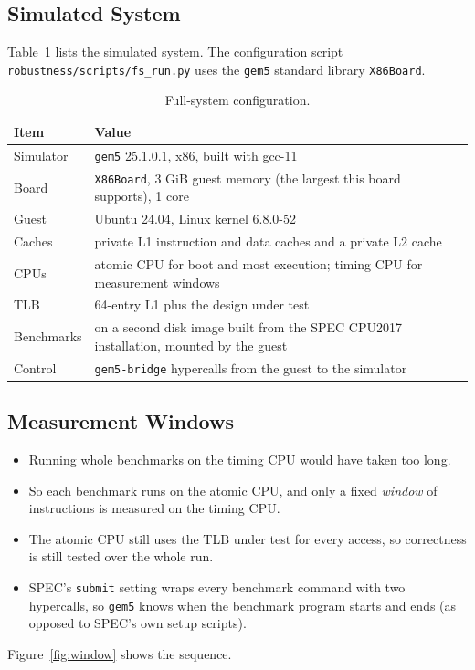 \subsection{Simulated System}
Table~\ref{tab:fs_setup} lists the simulated system. The configuration script \texttt{robustness/scripts/fs\_run.py} uses the \texttt{gem5} standard library \texttt{X86Board}.

\begin{table}[H]
\centering
\small
\caption{Full-system configuration.}
\label{tab:fs_setup}
\begin{tabularx}{\textwidth}{l X}
\toprule
\textbf{Item} & \textbf{Value} \\
\midrule
Simulator & \texttt{gem5} 25.1.0.1, x86, built with gcc-11 \\
Board & \texttt{X86Board}, 3 GiB guest memory (the largest this board supports), 1 core \\
Guest & Ubuntu 24.04, Linux kernel 6.8.0-52 \\
Caches & private L1 instruction and data caches and a private L2 cache \\
CPUs & atomic CPU for boot and most execution; timing CPU for measurement windows \\
TLB & 64-entry L1 plus the design under test \\
Benchmarks & on a second disk image built from the SPEC CPU2017 installation, mounted by the guest \\
Control & \texttt{gem5-bridge} hypercalls from the guest to the simulator \\
\bottomrule
\end{tabularx}
\end{table}

\subsection{Measurement Windows}
\begin{itemize}
    \item Running whole benchmarks on the timing CPU would have taken too long.
    \item So each benchmark runs on the atomic CPU, and only a fixed \emph{window} of instructions is measured on the timing CPU.
    \item The atomic CPU still uses the TLB under test for every access, so correctness is still tested over the whole run.
    \item SPEC's \texttt{submit} setting wraps every benchmark command with two hypercalls, so \texttt{gem5} knows when the benchmark program starts and ends (as opposed to SPEC's own setup scripts).
\end{itemize}
Figure~\ref{fig:window} shows the sequence.

